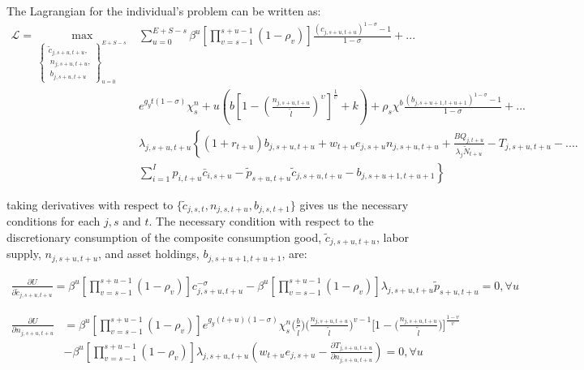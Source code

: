     The Lagrangian for the individual's problem can be written as:
     \begin{equation}\label{eqn:hh_prob_lagrangian}
      \begin{split}
     \mathcal{L} =  \max_{\left\{ \substack{\tilde{c}_{j,s+u,t+u},\\\ {n}_{j,s+u,t+u},\\\ {b}_{j,s+u,t+u}}\right\}_{u=0}^{E+S-s}}  &  \sum_{u=0}^{E+S-s}\beta^u\left[\prod_{v=s-1}^{s+u-1}(1-\rho_v)\right]  \frac{\left(c_{j,s+u,t+u}\right)^{1-\sigma} - 1}{1-\sigma} + ...\\
  &   e^{g_y t(1-\sigma)}\chi^n_s+u\left(b\left[1 - \left(\frac{n_{j,s+u,t+u}}{\tilde{l}}\right)^\upsilon\right]^\frac{1}{\upsilon} + k\right) + \rho_s\chi^b\frac{\left(b_{j,s+u+1,t+u+1}\right)^{1-\sigma} - 1}{1-\sigma}  +... \\
       & \lambda_{j,s+u,t+u}\left\{ (1+r_{t+u})b_{j,s+u,t+u} + w_{t+u}e_{j,s+u}n_{j,s+u,t+u}+\frac{BQ_{j,t+u}}{\lambda_{j}\tilde{N}_{t+u}}-T_{j,s+u,t+u} -.... \right.\\
       & \left. \sum_{i=1}^{I}p_{i,t+u}\bar{c}_{i,s+u}-\tilde{p}_{s+u,t+u}\tilde{c}_{j,s+u,t+u} -b_{j,s+u+1,t+u+1} \right\}
        \end{split}
    \end{equation}
    
    
    
\noindent\noindent taking derivatives with respect to $\{\tilde{c}_{j,s,t},n_{j,s,t+u},b_{j,s,t+1}\}$ gives us the necessary conditions for each $j,s$ and $t$.  The necessary condition with respect to the discretionary consumption of the composite consumption good, $\tilde{c}_{j,s+u,t+u}$, labor supply, $n_{j,s+u,t+u}$, and asset holdings, $b_{j,s+u+1,t+u+1}$, are:
  
    \begin{equation}\label{Eqcfoc}
      \begin{split}
     \frac{\partial U}{\partial \tilde{c}_{j,s+u,t+u}}  = \beta^u\left[\prod_{v=s-1}^{s+u-1}(1-\rho_v)\right] c_{j,s+u,t+u}^{-\sigma} - \beta^u\left[\prod_{v=s-1}^{s+u-1}(1-\rho_v)\right]  \lambda_{j,s+u,t+u} \tilde{p}_{s+u,t+u} = 0, \forall u
        \end{split}
    \end{equation}

    \begin{equation}\label{Eqnfoc}
      \begin{split}
      \frac{\partial U}{\partial n_{j,s+u,t+u}} & = \beta^u\left[\prod_{v=s-1}^{s+u-1}(1-\rho_v)\right] e^{g_y (t+u)(1-\sigma)}\chi^n_{s}\biggl(\frac{b}{\tilde{l}}\biggr)\biggl(\frac{n_{j,s+u,t+u}}{\tilde{l}}\biggr)^{v-1}\Biggl[1 - \biggl(\frac{n_{j,s+u,t+u}}{\tilde{l}}\biggr)\Biggr]^{\frac{1-v}{v}} \\
      & -  \beta^u\left[\prod_{v=s-1}^{s+u-1}(1-\rho_v)\right]\lambda_{j,s+u,t+u} \left( w_{t+u} e_{j,s+u} - \frac{\partial T_{j,s+u,t+u}}{\partial n_{j,s+u,t+u}} \right)= 0, \forall u
        \end{split}
    \end{equation}

